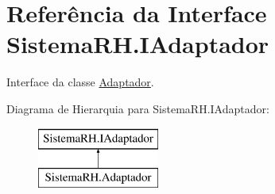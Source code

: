 \hypertarget{interface_sistema_r_h_1_1_i_adaptador}{
\section{Referência da Interface SistemaRH.IAdaptador}
\label{interface_sistema_r_h_1_1_i_adaptador}
}


Interface da classe \hyperlink{class_sistema_r_h_1_1_adaptador}{Adaptador}.  


Diagrama de Hierarquia para SistemaRH.IAdaptador:\begin{figure}[H]
\begin{center}
\leavevmode
\includegraphics[height=2.000000cm]{interface_sistema_r_h_1_1_i_adaptador}
\end{center}
\end{figure}
